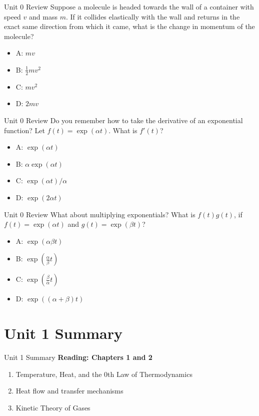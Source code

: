 \documentclass{beamer}
\begin{document}
\begin{frame}{Unit 0 Review}
Suppose a molecule is headed towards the wall of a container with speed $v$ and mass $m$.  If it collides elastically with the wall and returns in the exact same direction from which it came, what is the change in momentum of the molecule?
\begin{itemize}
\item A: $mv$
\item B: $\frac{1}{2}mv^2$
\item C: $mv^2$
\item D: $2mv$
\end{itemize}
\end{frame}

\begin{frame}{Unit 0 Review}
Do you remember how to take the derivative of an exponential function?  Let $f(t) = \exp(\alpha t)$.  What is $f'(t)$?
\begin{itemize}
\item A: $\exp(\alpha t)$
\item B: $\alpha\exp(\alpha t)$
\item C: $\exp(\alpha t)/\alpha$
\item D: $\exp(2\alpha t)$
\end{itemize}
\end{frame}

\begin{frame}{Unit 0 Review}
What about multiplying exponentials?  What is $f(t)g(t)$, if $f(t) = \exp(\alpha t)$ and $g(t) = \exp(\beta t)$?
\begin{itemize}
\item A: $\exp(\alpha\beta t)$
\item B: $\exp(\frac{\alpha}{\beta} t)$
\item C: $\exp(\frac{\beta}{\alpha} t)$
\item D: $\exp((\alpha+\beta) t)$
\end{itemize}
\end{frame}

\section{Unit 1 Summary}

\begin{frame}{Unit 1 Summary}
\textbf{Reading: Chapters 1 and 2}
\begin{enumerate}
\item Temperature, Heat, and the 0th Law of Thermodynamics
\item Heat flow and transfer mechanisms
\item Kinetic Theory of Gases
\end{enumerate}
\end{frame}
\end{document}
